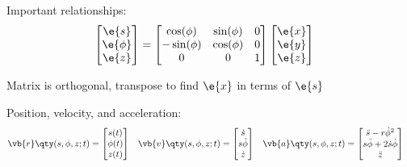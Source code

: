     Important relationships:
    \begin{align*}
        \begin{bmatrix}
        \e{s}\\
        \e{\phi}\\
        \e{z}
        \end{bmatrix}
        &=
        \begin{bmatrix}
        \cos(\phi)&\sin(\phi)&0\\
        -\sin(\phi)&\cos(\phi)&0\\
        0&0&1
        \end{bmatrix}
        \begin{bmatrix}
        \e{x}\\
        \e{y}\\
        \e{z}
        \end{bmatrix}
    \end{align*}
    \begin{center}
    Matrix is orthogonal, transpose to find $\e{x}$ in terms of $\e{s}$
    \vspace{0.5 cm}
    \end{center}
    Position, velocity, and acceleration:
    \begin{align*}
        \vb{r}\qty(s,\phi,z;t)&=
        \begin{bmatrix}
            s(t)
            \\
            \phi(t)
            \\
            z(t)
        \end{bmatrix}
        &
        \vb{v}\qty(s,\phi,z;t)&=
        \begin{bmatrix}
            \dot{s}
            \\
            s\dot{\phi}
            \\
            \dot{z}
        \end{bmatrix}
        &
        \vb{a}\qty(s,\phi,z;t)&=
        \begin{bmatrix}
            \Ddot{s}-r\dot{\phi}^2
            \\
            s\Ddot{\phi}+2\dot{s}\dot{\phi}
            \\
            \Ddot{z}
        \end{bmatrix}
    \end{align*}
    \newpage\noindent
    

\newpage
